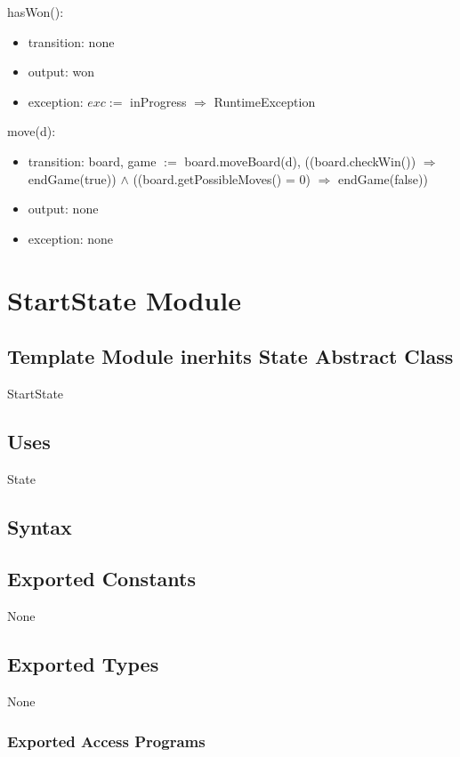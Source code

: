 \documentclass[12pt]{article}
\begin{document}
\noindent hasWon():
\begin{itemize}
\item transition: none
\item output: won
\item exception: $exc :=$ inProgress $\Rightarrow$ RuntimeException
\end{itemize}

\noindent move(d):
\begin{itemize}
\item transition: board, game $:=$ board.moveBoard(d), ((board.checkWin()) $\Rightarrow$ endGame(true)) $\land$ ((board.getPossibleMoves() = 0) $\Rightarrow$ endGame(false))
\item output: none
\item exception: none
\end{itemize}

\newpage

\section* {StartState Module}

\subsection* {Template Module inerhits State Abstract Class}

StartState

\subsection*{Uses}

State

\subsection* {Syntax}

\subsection*{Exported Constants}

None

\subsection*{Exported Types}

None

\subsubsection* {Exported Access Programs}
\end{document}
